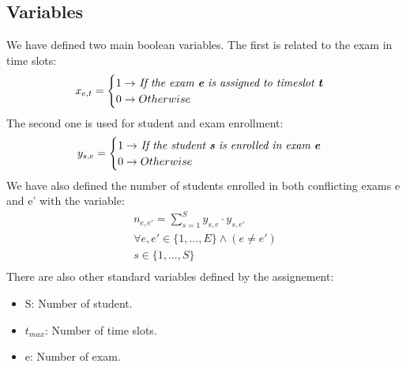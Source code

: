 \documentclass[12pt]{article}
\begin{document}
\subsection{Variables}
We have defined two main boolean variables. The first is related to the exam in time slots:
\begin{equation}
  \begin{gathered}
    x_{e,t} = \begin{cases} 1 \rightarrow $ \textit{If the exam \textbf{e} is assigned to timeslot \textbf{t}}$ \\ 0 \rightarrow Otherwise \end{cases}
  \end{gathered}
\end{equation}
The second one is used for student and exam enrollment:
\begin{equation}
  \begin{gathered}
    y_{s,e} = \begin{cases} 1 \rightarrow $ \textit{If the student \textbf{s} is enrolled in exam \textbf{e}}$ \\ 0 \rightarrow Otherwise \end{cases}
  \end{gathered}
\end{equation}
We have also defined the number of students enrolled in both conflicting exams e and e' with the variable:
\begin{equation}
  \begin{gathered}
    n_{e,e'} = \sum_{s = 1}^{S} y_{s,e} \cdot y_{s,e'}\\
    \forall e, e' \in \{1,...,E\} \wedge (e \neq e')\\
    s\in\{1,...,S\}\\
  \end{gathered}
\end{equation}
There are also other standard variables defined by the assignement:
\begin{itemize}
  \item S: Number of student.
  \item $t_{max}$: Number of time slots.
  \item e: Number of exam.
\end{itemize}
\end{document}
